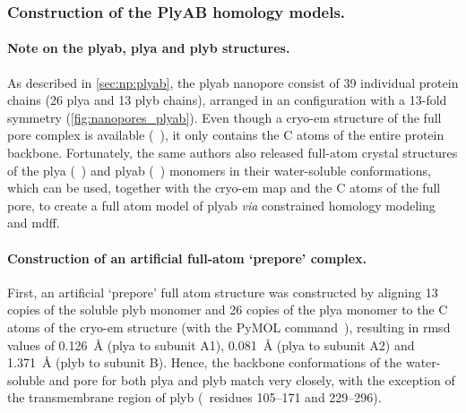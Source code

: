 \subsubsection{Construction of the PlyAB homology models.}
%

\paragraph{Note on the \gls{plyab}, \gls{plya} and \gls{plyb} structures.}
%
As described in \cref{sec:np:plyab}, the \Gls{plyab} nanopore consist of 39 individual protein chains (26
\gls{plya} and 13 \gls{plyb} chains), arranged in an  configuration with a 13-fold symmetry
(\cref{fig:nanopores_plyab}). Even though a \gls{cryo-em} structure of the full pore complex is available
(~\cite{Lukoyanova-Kondos-2015}), it only contains the C\ta{} atoms of the entire protein
backbone. Fortunately, the same authors also released full-atom crystal structures of the \gls{plya}
(~\cite{Lukoyanova-Kondos-2015}) and \gls{plyab} (~\cite{Lukoyanova-Kondos-2015})
monomers in their water-soluble conformations, which can be used, together with the \gls{cryo-em} map and the
C\ta{} atoms of the full pore, to create a full atom model of \gls{plyab} \textit{via} constrained homology
modeling and \gls{mdff}.

\paragraph{Construction of an artificial full-atom `prepore' complex.}
%
First, an artificial `prepore' full atom structure was constructed by aligning 13 copies of the soluble
\gls{plyb} monomer and 26 copies of the \gls{plya} monomer to the C\ta{} atoms of the \gls{cryo-em} structure
(with the PyMOL  command~\cite{PyMOL}), resulting in \gls{rmsd} values of \SI{0.126}{\angstrom}
(\gls{plya} to subunit A1), \SI{0.081}{\angstrom} (\gls{plya} to subunit A2) and \SI{1.371}{\angstrom}
(\gls{plyb} to subunit B). Hence, the backbone conformations of the water-soluble and pore for both \gls{plya}
and \gls{plyb} match very closely, with the exception of the transmembrane region of \gls{plyb} (\ie~residues
\numrange{105}{171} and \numrange{229}{296}).

